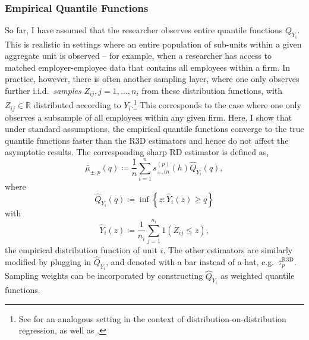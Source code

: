 \documentclass[12pt]{article}
\newcommand{\sumn}{\sum_{i=1}^n}
\begin{document}

\subsubsection{Empirical Quantile Functions} \label{sec:empirical_cdfs}

So far, I have assumed that the researcher observes entire quantile functions $Q_{Y_i}$. This is realistic in settings where an entire population of sub-units within a given aggregate unit is observed -- for example, when a researcher has access to matched employer-employee data that contains all employees within a firm. In practice, however, there is often another sampling layer, where one only observes further i.i.d.~\emph{samples} $Z_{ij}, j=1,\ldots,n_i$ from these distribution functions, with $Z_{ij} \in \mathbb{R}$ distributed according to $Y_i$.\footnote{See \citet{chen2023wasserstein} for an analogous setting in the context of distribution-on-distribution regression, as well as \citet{zhou2024wasserstein}.} This corresponds to the case where one only observes a subsample of all employees within any given firm. Here, I show that under standard assumptions, the empirical quantile functions converge to the true quantile functions faster than the R3D estimators and hence do not affect the asymptotic results. The corresponding sharp RD estimator is defined as,
\begin{equation}
\bar{\mu}_{\pm,p}(q) \coloneqq \frac1n \sumn s^{(p)}_{\pm,in}(h) \widehat{Q}_{Y_i}(q),
\end{equation}
where 
\begin{equation} \label{eq:empirical_quantile}
\widehat{Q}_{Y_i}(q) \coloneqq \inf\left\{ z : \widehat{Y}_i(z) \geq q\right\} 
\end{equation}
with 
\[
\widehat{Y}_i(z) \coloneqq \frac{1}{n_i} \sum_{j=1}^{n_i} \mathrm{1}\left( Z_{ij} \leq z \right),
\]
the empirical distribution function of unit $i$. The other estimators are similarly modified by plugging in $\widehat{Q}_{Y_i}$, and denoted with a bar instead of a hat, e.g.\ $\bar{\tau}_p^{\mathrm{R3D}}$. Sampling weights can be incorporated by constructing $\widehat{Q}_{Y_i}$ as weighted quantile functions. 
\end{document}

